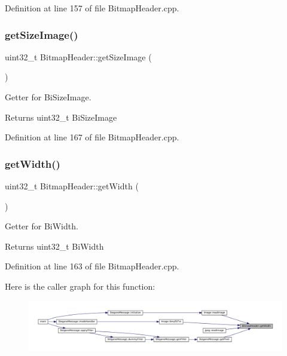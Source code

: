 Definition at line 157 of file Bitmap\+Header.\+cpp.

\mbox{\label{classBitmapHeader_aa55f157d6852ce35add8c5db54ccadae}} 
\subsubsection{\texorpdfstring{getSizeImage()}{getSizeImage()}}
{\footnotesize\ttfamily uint32\+\_\+t Bitmap\+Header\+::get\+Size\+Image (\begin{DoxyParamCaption}{ }\end{DoxyParamCaption})}



Getter for Bi\+Size\+Image. 

\begin{DoxyReturn}{Returns}
uint32\+\_\+t Bi\+Size\+Image 
\end{DoxyReturn}


Definition at line 167 of file Bitmap\+Header.\+cpp.

\mbox{\label{classBitmapHeader_af1d36ee9f3315866f05c39c2f4871e09}} 
\subsubsection{\texorpdfstring{getWidth()}{getWidth()}}
{\footnotesize\ttfamily uint32\+\_\+t Bitmap\+Header\+::get\+Width (\begin{DoxyParamCaption}{ }\end{DoxyParamCaption})}



Getter for Bi\+Width. 

\begin{DoxyReturn}{Returns}
uint32\+\_\+t Bi\+Width 
\end{DoxyReturn}


Definition at line 163 of file Bitmap\+Header.\+cpp.

Here is the caller graph for this function\+:\nopagebreak
\begin{figure}[H]
\begin{center}
\leavevmode
\includegraphics[width=350pt]{classBitmapHeader_af1d36ee9f3315866f05c39c2f4871e09_icgraph}
\end{center}
\end{figure}
\mbox{\label{classBitmapHeader_a72e26bdf3269d382dfbdc76119c1a6aa}} 
